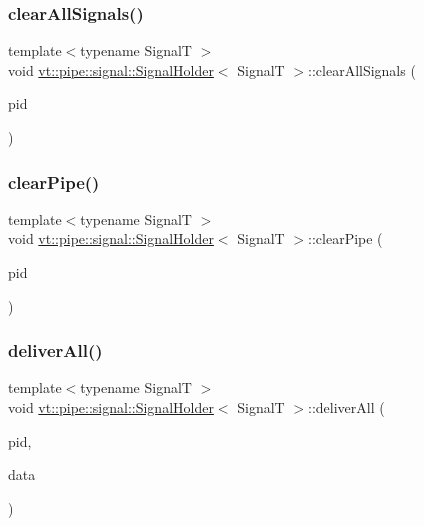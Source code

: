 \subsubsection{\texorpdfstring{clear\+All\+Signals()}{clearAllSignals()}}
{\footnotesize\ttfamily template$<$typename SignalT $>$ \\
void \hyperlink{structvt_1_1pipe_1_1signal_1_1_signal_holder}{vt\+::pipe\+::signal\+::\+Signal\+Holder}$<$ SignalT $>$\+::clear\+All\+Signals (\begin{DoxyParamCaption}\item[{\hyperlink{namespacevt_ac9852acda74d1896f48f406cd72c7bd3}{Pipe\+Type} const \&}]{pid }\end{DoxyParamCaption})}

\mbox{\label{structvt_1_1pipe_1_1signal_1_1_signal_holder_a9f31fab057a4e9af38547859572b6127}} 
\subsubsection{\texorpdfstring{clear\+Pipe()}{clearPipe()}}
{\footnotesize\ttfamily template$<$typename SignalT $>$ \\
void \hyperlink{structvt_1_1pipe_1_1signal_1_1_signal_holder}{vt\+::pipe\+::signal\+::\+Signal\+Holder}$<$ SignalT $>$\+::clear\+Pipe (\begin{DoxyParamCaption}\item[{\hyperlink{namespacevt_ac9852acda74d1896f48f406cd72c7bd3}{Pipe\+Type} const \&}]{pid }\end{DoxyParamCaption})}

\mbox{\label{structvt_1_1pipe_1_1signal_1_1_signal_holder_a3e04f57a784e41c422357dfda7871304}} 
\subsubsection{\texorpdfstring{deliver\+All()}{deliverAll()}}
{\footnotesize\ttfamily template$<$typename SignalT $>$ \\
void \hyperlink{structvt_1_1pipe_1_1signal_1_1_signal_holder}{vt\+::pipe\+::signal\+::\+Signal\+Holder}$<$ SignalT $>$\+::deliver\+All (\begin{DoxyParamCaption}\item[{\hyperlink{namespacevt_ac9852acda74d1896f48f406cd72c7bd3}{Pipe\+Type} const \&}]{pid,  }\item[{\hyperlink{structvt_1_1pipe_1_1signal_1_1_signal_holder_aad5bfc2b46dfa071ae638385324d7e31}{Data\+Ptr\+Type}}]{data }\end{DoxyParamCaption})}

